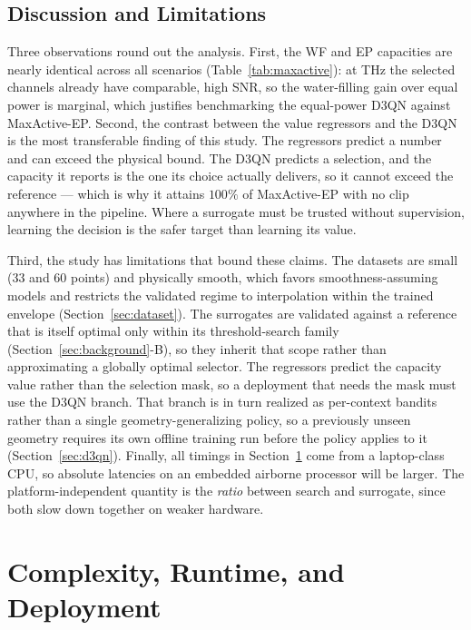 \documentclass[journal]{IEEEtran}
\begin{document}
\subsection{Discussion and Limitations}
\label{sec:discussion}
Three observations round out the analysis. First, the WF and EP capacities are nearly
identical across all scenarios (Table~\ref{tab:maxactive}): at THz the selected channels
already have comparable, high SNR, so the water-filling gain over equal power is
marginal, which justifies benchmarking the equal-power D3QN against MaxActive-EP. Second,
the contrast between the value regressors and the D3QN is the most transferable finding of
this study. The regressors predict a number and can exceed the physical bound. The D3QN
predicts a selection, and the capacity it reports is the one its choice actually delivers,
so it cannot exceed the reference --- which is why it attains $100\%$ of MaxActive-EP with
no clip anywhere in the pipeline. Where a surrogate must be trusted without supervision,
learning the decision is the safer target than learning its value.

Third, the study has limitations that bound these claims. The datasets are small ($33$ and
$60$ points) and physically smooth, which favors smoothness-assuming models and restricts
the validated regime to interpolation within the trained envelope
(Section~\ref{sec:dataset}). The surrogates are validated against a reference that is
itself optimal only within its threshold-search family (Section~\ref{sec:background}-B),
so they inherit that scope rather than approximating a globally optimal selector. The
regressors predict the capacity value rather than the selection mask, so a deployment that
needs the mask must use the D3QN branch. That branch is in turn realized as per-context
bandits rather than a single geometry-generalizing policy, so a previously unseen geometry
requires its own offline training run before the policy applies to it
(Section~\ref{sec:d3qn}).
Finally, all timings in Section~\ref{sec:complexity} come from a laptop-class CPU, so
absolute latencies on an embedded airborne processor will be larger. The
platform-independent quantity is the \emph{ratio} between search and surrogate, since both
slow down together on weaker hardware.

\section{Complexity, Runtime, and Deployment}
\label{sec:complexity}
\end{document}
